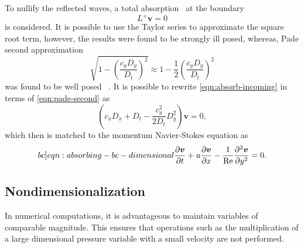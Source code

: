 \documentclass{article}
\begin{document}
To nullify the reflected waves, a total absorption~\cite{Engquist:1977} at the boundary
\begin{equation}\label{eqn:absorb-incoming}
	L^+\boldsymbol{v}=0
\end{equation}
is considered. It is possible to use the Taylor series to approximate the square root term, however, the results were found to be strongly ill posed, whereas, Pade second approximation
\begin{equation}\label{eqn:pade-second}
	\sqrt{1-\left( \frac{c_y D_y}{D_t}\right)^2}\approx1-\frac{1}{2}\left( \frac{c_y D_y}{D_t}\right)^2
\end{equation}
was found to be well posed~\cite{Engquist:1977,Kreiss:1970} . It is possible to rewrite \cref{eqn:absorb-incoming} in terms of \cref{eqn:pade-second} as
\begin{equation*}
	\left( c_xD_x + D_t - \frac{c^2_y}{2D_t}D_y^2 \right)\boldsymbol{v}=0,
\end{equation*}
which then is matched to the momentum Navier-Stokes equation as
\begin{equation}\label[bc]{eqn:absorbing-bc-dimensional}
	\frac{\partial \boldsymbol{v}}{\partial t} + u\frac{\partial \boldsymbol{v}}{\partial x}-\frac{1}{\operatorname{Re}}\frac{\partial ^2 \boldsymbol{v}}{\partial y^2}=0.
\end{equation}




\subsection{Nondimensionalization}\label{subsec:Nondimensionalization}
In numerical computations, it is advantageous to maintain variables of comparable magnitude. This ensures that operations such as the multiplication of a large dimensional pressure variable with a small velocity are not performed. 
\end{document}
